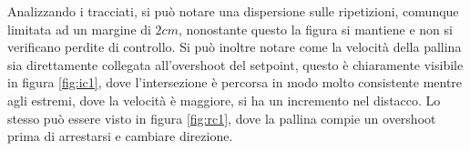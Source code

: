 \documentclass[12pt,twoside,openright]{report}
\begin{document}
Analizzando i tracciati, si può notare una dispersione sulle ripetizioni, comunque limitata ad un margine di $2cm$, nonostante questo la figura si mantiene e non si verificano perdite di controllo. Si può inoltre notare come la velocità della pallina sia direttamente collegata all'overshoot del setpoint, questo è chiaramente visibile in figura \ref{fig:ic1}, dove l'intersezione è percorsa in modo molto consistente mentre agli estremi, dove la velocità è maggiore, si ha un incremento nel distacco. Lo stesso può essere visto in figura \ref{fig:rc1}, dove la pallina compie un overshoot prima di arrestarsi e cambiare direzione. %
\end{document}
